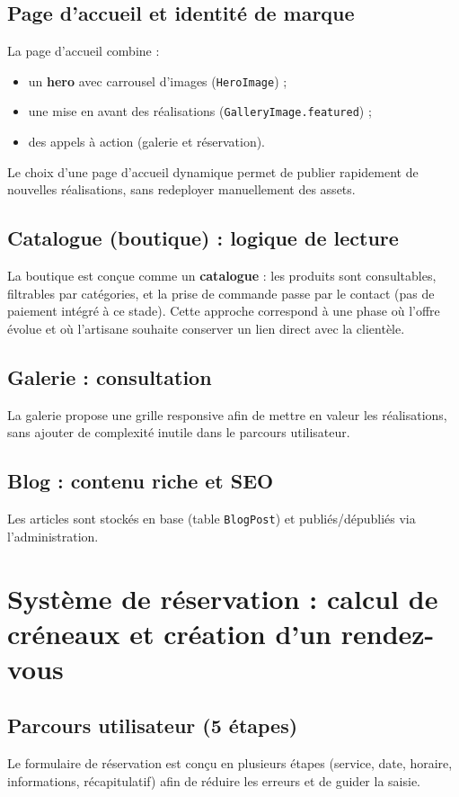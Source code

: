 \subsection{Page d’accueil et identité de marque}
La page d’accueil combine :
\begin{itemize}
    \item un \textbf{hero} avec carrousel d’images (\texttt{HeroImage}) ;
    \item une mise en avant des réalisations (\texttt{GalleryImage.featured}) ;
    \item des appels à action (galerie et réservation).
\end{itemize}
Le choix d’une page d’accueil dynamique permet de publier rapidement de nouvelles réalisations, sans redeployer manuellement des assets.

\subsection{Catalogue (boutique) : logique de lecture}
La boutique est conçue comme un \textbf{catalogue} : les produits sont consultables, filtrables par catégories, et la prise de commande passe par le contact (pas de paiement intégré à ce stade). Cette approche correspond à une phase où l’offre évolue et où l’artisane souhaite conserver un lien direct avec la clientèle.

\subsection{Galerie : consultation}
La galerie propose une grille responsive afin de mettre en valeur les réalisations, sans ajouter de complexité inutile dans le parcours utilisateur.

\subsection{Blog : contenu riche et SEO}
Les articles sont stockés en base (table \texttt{BlogPost}) et publiés/dépubliés via l’administration.

\section{Système de réservation : calcul de créneaux et création d’un rendez-vous}

\subsection{Parcours utilisateur (5 étapes)}
Le formulaire de réservation est conçu en plusieurs étapes (service, date, horaire, informations, récapitulatif) afin de réduire les erreurs et de guider la saisie.

